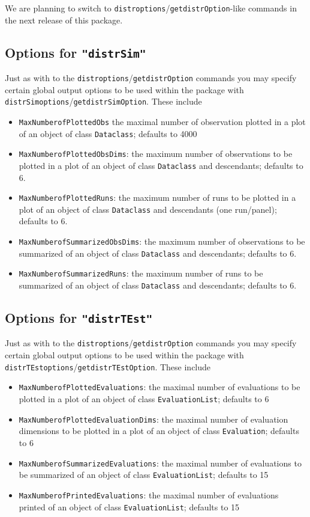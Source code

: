 \documentclass[11pt]{article}
\newcommand{\code}[1]{{\tt #1}}
\newcommand{\pkg}[1]{{\tt "#1"}}
\begin{document}
We are planning to switch to \code{distroptions}/\code{getdistrOption}-like commands in the next release of this package.
%
\subsection[Options for distrSim]{Options for \pkg{distrSim}}
Just as with to the \code{distroptions}/\code{getdistrOption} commands you may specify certain
global output options to be used within the package with \code{distrSimoptions}/\code{getdistrSimOption}. These include
\begin{itemize}
  \item \code{MaxNumberofPlottedObs} the maximal number of observation plotted in a plot of an object of class \code{Dataclass}; defaults to 4000

  \item \code{MaxNumberofPlottedObsDims}: the maximum number of observations to be plotted in a plot of an object of class \code{Dataclass}
  and descendants; defaults to 6.
  \item \code{MaxNumberofPlottedRuns}: the maximum number of runs to be plotted in a plot of an object of class \code{Dataclass}
  and descendants (one run/panel); defaults to 6.
  \item \code{MaxNumberofSummarizedObsDims}: the maximum number of observations to be summarized of an object of class \code{Dataclass}
  and descendants; defaults to 6.
  \item \code{MaxNumberofSummarizedRuns}: the maximum number of runs to be summarized of an object of class \code{Dataclass}
  and descendants; defaults to 6.
\end{itemize}
%
\subsection[Options for distrTEst]{Options for \pkg{distrTEst}}
Just as with to the \code{distroptions}/\code{getdistrOption} commands you may specify certain
global output options to be used within the package with \code{distrTEstoptions}/\code{getdistrTEstOption}. These include
\begin{itemize}
  \item \code{MaxNumberofPlottedEvaluations}:  the maximal number of evaluations to be plotted
  in a plot of an object of class \code{EvaluationList}; defaults to 6
  \item \code{MaxNumberofPlottedEvaluationDims}: the maximal number of evaluation dimensions to be plotted in a plot of an
         object of class \code{Evaluation}; defaults to 6
  \item \code{MaxNumberofSummarizedEvaluations}: the  maximal number of evaluations to be summarized of an object of class
  \code{EvaluationList}; defaults to 15
  \item \code{MaxNumberofPrintedEvaluations}: the maximal number of evaluations printed of an object of class
  \code{EvaluationList}; defaults to 15
\end{itemize}
\end{document}
